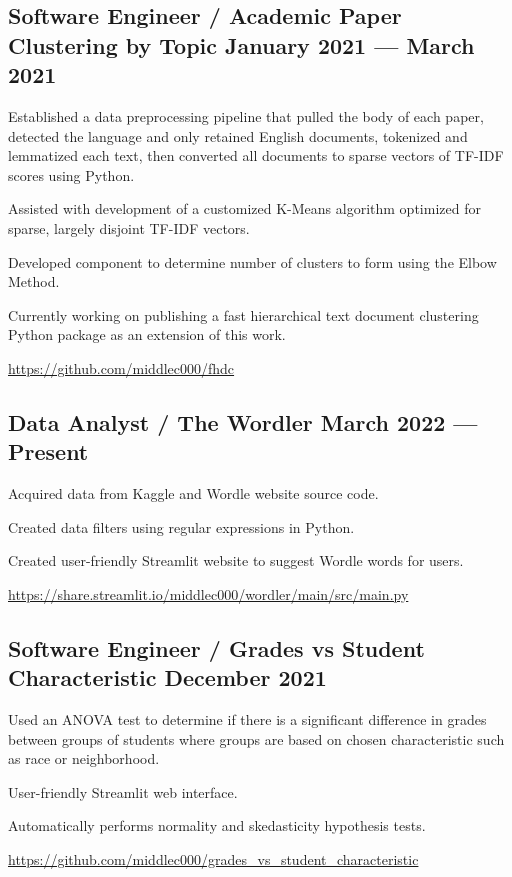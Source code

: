 \documentclass[letter,10pt]{article}
\begin{document}
\subsection{{Software Engineer / Academic Paper Clustering by Topic \hfill January 2021 --- March 2021}}
\begin{zitemize}
    \item Established a data preprocessing pipeline that pulled the body of each paper, detected the language and only retained English documents, tokenized and lemmatized each text, then converted all documents to sparse vectors of TF-IDF scores using Python.
    \item Assisted with development of a customized K-Means algorithm optimized for sparse, largely disjoint TF-IDF vectors.
    \item Developed component to determine number of clusters to form using the Elbow Method.
    \item Currently working on publishing a fast hierarchical text document clustering Python package as an extension of this work.
    \item \url{https://github.com/middlec000/fhdc}
\end{zitemize}

\newpage
\subsection{{Data Analyst / The Wordler \hfill March 2022 --- Present}}
\begin{zitemize}
    \item Acquired data from Kaggle and Wordle website source code.
    \item Created data filters using regular expressions in Python.
    \item Created user-friendly Streamlit website to suggest Wordle words for users.
    \item \url{https://share.streamlit.io/middlec000/wordler/main/src/main.py}
\end{zitemize}

\subsection{{Software Engineer / Grades vs Student Characteristic \hfill December 2021}}
\begin{zitemize}
    \item Used an ANOVA test to determine if there is a significant difference in grades between groups of students where groups are based on chosen characteristic such as race or neighborhood.
    \item User-friendly Streamlit web interface.
    \item Automatically performs normality and skedasticity hypothesis tests.
    \item \url{https://github.com/middlec000/grades_vs_student_characteristic}
\end{zitemize}
\end{document}
